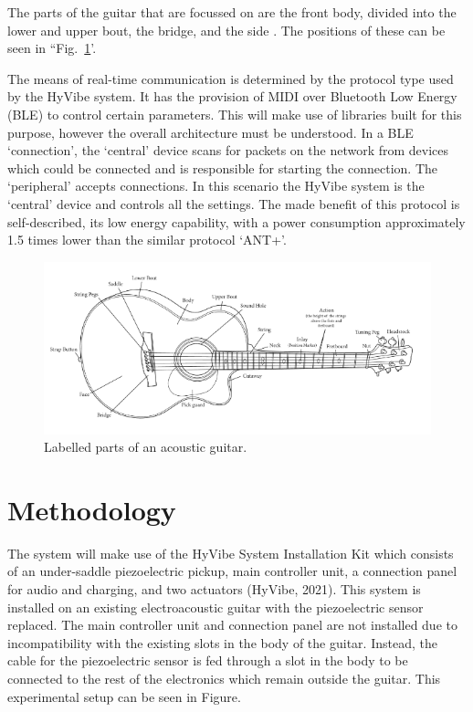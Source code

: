 \documentclass[conference]{IEEEtran}
\begin{document}
The parts of the guitar that are focussed on are the front body, divided into the lower and upper bout, the bridge, and the side \cite{b3}. The positions of these can be seen in ``Fig.~\ref{guitar}'.

The means of real-time communication is determined by the protocol type used by the HyVibe system. It has the provision of MIDI over Bluetooth Low Energy (BLE) to control certain parameters. This will
make use of libraries built for this purpose, however the overall architecture must be understood. In a BLE `connection', the `central' device scans for packets on the network from devices which could be connected and 
is responsible for starting the connection. The `peripheral' accepts connections. In this scenario the HyVibe system is the `central' device and controls all the settings. The made benefit of this protocol is self-described,
its low energy capability, with a power consumption approximately 1.5 times lower than the similar protocol `ANT+'.

\begin{figure}[htbp]
    \centerline{\includegraphics[scale=0.4]{guitar.png}}
    \caption{Labelled parts of an acoustic guitar. \cite{b3}}
    \label{guitar}
    \end{figure}

\section{Methodology}
The system will make use of the HyVibe System Installation Kit which consists of an under-saddle piezoelectric pickup, main controller unit, a connection panel for audio and charging, and two actuators (HyVibe, 2021).
This system is installed on an existing electroacoustic guitar with the piezoelectric sensor replaced. The main controller unit and connection panel are not installed due to incompatibility with the existing slots in
the body of the guitar. Instead, the cable for the piezoelectric sensor is fed through a slot in the body to be connected to the rest of the electronics which remain outside the guitar. This experimental setup can be
seen in Figure. 
\end{document}
